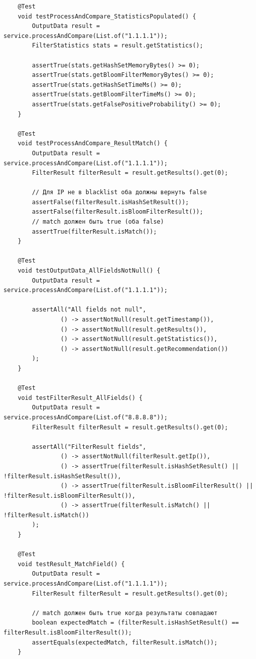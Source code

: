 \begin{verbatim}
    @Test
    void testProcessAndCompare_StatisticsPopulated() {
        OutputData result = service.processAndCompare(List.of("1.1.1.1"));
        FilterStatistics stats = result.getStatistics();

        assertTrue(stats.getHashSetMemoryBytes() >= 0);
        assertTrue(stats.getBloomFilterMemoryBytes() >= 0);
        assertTrue(stats.getHashSetTimeMs() >= 0);
        assertTrue(stats.getBloomFilterTimeMs() >= 0);
        assertTrue(stats.getFalsePositiveProbability() >= 0);
    }

    @Test
    void testProcessAndCompare_ResultMatch() {
        OutputData result = service.processAndCompare(List.of("1.1.1.1"));
        FilterResult filterResult = result.getResults().get(0);

        // Для IP не в blacklist оба должны вернуть false
        assertFalse(filterResult.isHashSetResult());
        assertFalse(filterResult.isBloomFilterResult());
        // match должен быть true (оба false)
        assertTrue(filterResult.isMatch());
    }

    @Test
    void testOutputData_AllFieldsNotNull() {
        OutputData result = service.processAndCompare(List.of("1.1.1.1"));

        assertAll("All fields not null",
                () -> assertNotNull(result.getTimestamp()),
                () -> assertNotNull(result.getResults()),
                () -> assertNotNull(result.getStatistics()),
                () -> assertNotNull(result.getRecommendation())
        );
    }

    @Test
    void testFilterResult_AllFields() {
        OutputData result = service.processAndCompare(List.of("8.8.8.8"));
        FilterResult filterResult = result.getResults().get(0);

        assertAll("FilterResult fields",
                () -> assertNotNull(filterResult.getIp()),
                () -> assertTrue(filterResult.isHashSetResult() || !filterResult.isHashSetResult()),
                () -> assertTrue(filterResult.isBloomFilterResult() || !filterResult.isBloomFilterResult()),
                () -> assertTrue(filterResult.isMatch() || !filterResult.isMatch())
        );
    }

    @Test
    void testResult_MatchField() {
        OutputData result = service.processAndCompare(List.of("1.1.1.1"));
        FilterResult filterResult = result.getResults().get(0);

        // match должен быть true когда результаты совпадают
        boolean expectedMatch = (filterResult.isHashSetResult() == filterResult.isBloomFilterResult());
        assertEquals(expectedMatch, filterResult.isMatch());
    }


\end{verbatim}
